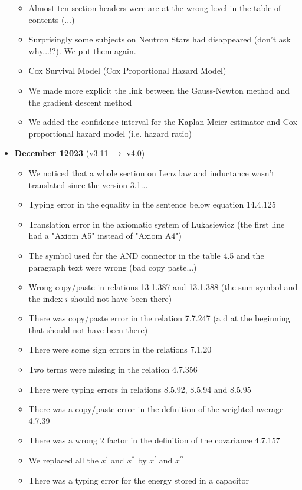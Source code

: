 \begin{itemize}
\begin{itemize}[noitemsep]
			\item Almost ten section headers were are at the wrong level in the table of contents (...)
			\item Surprisingly some subjects on Neutron Stars had disappeared (don't ask why...!?). We put them again.
			\item Cox Survival Model (Cox Proportional Hazard Model)
			\item We made more explicit the link between the Gauss-Newton method and the gradient descent method
			\item We added the confidence interval for the Kaplan-Meier estimator and Cox proportional hazard model (i.e. hazard ratio)
		\end{itemize}
	\pagebreak
	\item \textbf{December 12023} (v3.11 $\rightarrow$ v4.0)
		\begin{itemize}[noitemsep]
			\item We noticed that a whole section on Lenz law and inductance wasn't translated since the version 3.1...
			\item Typing error in the equality in the sentence below equation 14.4.125
			\item Translation error in the axiomatic system of Lukasiewicz (the first line had a "Axiom A5" instead of "Axiom A4")
			\item The symbol used for the AND connector in the table 4.5 and the paragraph text were wrong (bad copy paste...)
			\item Wrong copy/paste in relations 13.1.387 and 13.1.388 (the sum symbol and the index $i$ should not have been there)
			\item There was copy/paste error in the relation 7.7.247 (a $\mathrm{d}$ at the beginning that should not have been there)
			\item There were some sign errors in the relations 7.1.20
			\item Two terms were missing in the relation 4.7.356
			\item There were typing errors in relations 8.5.92, 8.5.94 and 8.5.95
			\item There was a copy/paste error in the definition of the weighted average 4.7.39
			\item There was a wrong $2$ factor in the definition of the covariance 4.7.157
			\item We replaced all the $x^{'}$ and $x^{''}$ by $x^\prime$ and $x^{\prime\prime}$
			\item There was a typing error for the energy stored in a capacitor

\end{itemize}
\end{itemize}
